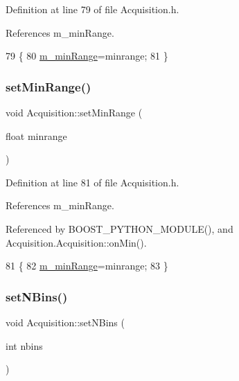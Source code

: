 Definition at line 79 of file Acquisition.\+h.



References m\+\_\+min\+Range.


\begin{DoxyCode}
79                                   \{
80     \hyperlink{classAcquisition_a06b3ea027ebdcb15f64a6517ceb99b76}{m\_minRange}=minrange;
81   \}
\end{DoxyCode}
\mbox{\label{classAcquisition_a8a15ffc6e539a3ae12efe4bea1ca7587}} 
\subsubsection{\texorpdfstring{set\+Min\+Range()}{setMinRange()}\hspace{0.1cm}{\footnotesize\ttfamily [2/2]}}
{\footnotesize\ttfamily void Acquisition\+::set\+Min\+Range (\begin{DoxyParamCaption}\item[{float}]{minrange }\end{DoxyParamCaption})\hspace{0.3cm}{\ttfamily [inline]}}



Definition at line 81 of file Acquisition.\+h.



References m\+\_\+min\+Range.



Referenced by B\+O\+O\+S\+T\+\_\+\+P\+Y\+T\+H\+O\+N\+\_\+\+M\+O\+D\+U\+L\+E(), and Acquisition.\+Acquisition\+::on\+Min().


\begin{DoxyCode}
81                                   \{
82     \hyperlink{classAcquisition_a06b3ea027ebdcb15f64a6517ceb99b76}{m\_minRange}=minrange;
83   \}
\end{DoxyCode}
\mbox{\label{classAcquisition_a6ee040a009aa48f848b1e12434135db9}} 
\subsubsection{\texorpdfstring{set\+N\+Bins()}{setNBins()}\hspace{0.1cm}{\footnotesize\ttfamily [1/2]}}
{\footnotesize\ttfamily void Acquisition\+::set\+N\+Bins (\begin{DoxyParamCaption}\item[{int}]{nbins }\end{DoxyParamCaption})\hspace{0.3cm}{\ttfamily [inline]}}



